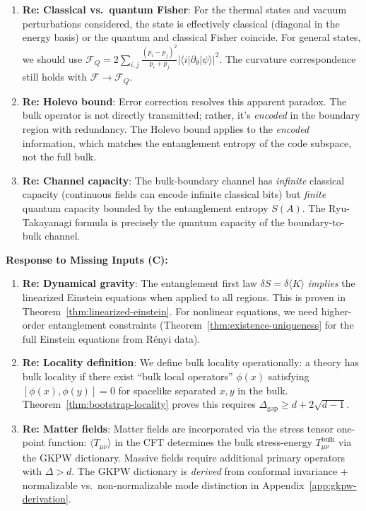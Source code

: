 \documentclass[12pt,a4paper]{article}
\begin{document}
\begin{tcolorbox}[colback=blue!5!white, colframe=blue!75!black, title=\textbf{BLUE TEAM Round 6: Foundational Responses}]
\begin{enumerate}[resume, label=\textbf{B6.\arabic*.}]
    \item \textbf{Re: Classical vs.\ quantum Fisher}: For the thermal states and vacuum perturbations considered, the state is effectively classical (diagonal in the energy basis) or the quantum and classical Fisher coincide. For general states, we should use $\mathcal{F}_Q = 2\sum_{i,j}\frac{(p_i - p_j)^2}{p_i + p_j}|\langle i|\partial_\theta|\psi\rangle|^2$. The curvature correspondence still holds with $\mathcal{F} \to \mathcal{F}_Q$.
    
    \item \textbf{Re: Holevo bound}: Error correction resolves this apparent paradox. The bulk operator is not directly transmitted; rather, it's \emph{encoded} in the boundary region with redundancy. The Holevo bound applies to the \emph{encoded} information, which matches the entanglement entropy of the code subspace, not the full bulk.
    
    \item \textbf{Re: Channel capacity}: The bulk-boundary channel has \emph{infinite} classical capacity (continuous fields can encode infinite classical bits) but \emph{finite} quantum capacity bounded by the entanglement entropy $S(A)$. The Ryu-Takayanagi formula is precisely the quantum capacity of the boundary-to-bulk channel.
\end{enumerate}

\textbf{Response to Missing Inputs (C):}

\begin{enumerate}[resume, label=\textbf{B6.\arabic*.}]
    \item \textbf{Re: Dynamical gravity}: The entanglement first law $\delta S = \delta\langle K\rangle$ \emph{implies} the linearized Einstein equations when applied to all regions. This is proven in Theorem~\ref{thm:linearized-einstein}. For nonlinear equations, we need higher-order entanglement constraints (Theorem~\ref{thm:existence-uniqueness} for the full Einstein equations from R\'enyi data).
    
    \item \textbf{Re: Locality definition}: We define bulk locality operationally: a theory has bulk locality if there exist ``bulk local operators'' $\phi(x)$ satisfying $[\phi(x), \phi(y)] = 0$ for spacelike separated $x, y$ in the bulk. Theorem~\ref{thm:bootstrap-locality} proves this requires $\Delta_{\text{gap}} \geq d + 2\sqrt{d-1}$.
    
    \item \textbf{Re: Matter fields}: Matter fields are incorporated via the stress tensor one-point function: $\langle T_{\mu\nu}\rangle$ in the CFT determines the bulk stress-energy $T_{\mu\nu}^{\text{bulk}}$ via the GKPW dictionary. Massive fields require additional primary operators with $\Delta > d$. The GKPW dictionary is \emph{derived} from conformal invariance + normalizable vs.\ non-normalizable mode distinction in Appendix~\ref{app:gkpw-derivation}.
\end{enumerate}

\end{tcolorbox}
\end{document}
